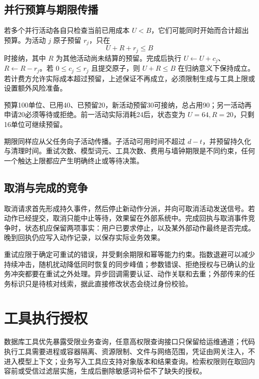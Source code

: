 \documentclass[../textbook.tex]{subfiles}
\begin{document}
\subsection{并行预算与期限传播}
若多个并行活动各自只检查当前已用成本 $U<B$，它们可能同时开始而合计超出预算。为活动 $j$ 原子预留 $r_j$，只在
\begin{equation}
 U+R+r_j\le B
 \label{eq:runtime-reserve}
\end{equation}
时接纳，其中 $R$ 为其他活动尚未结算的预留。完成后执行 $U\leftarrow U+c_j$、$R\leftarrow R-r_j$。若 $0\le c_j\le r_j$ 且提交原子，则 $U+R\le B$ 在归纳意义下保持成立。若计费方允许实际成本超过预留，上述保证不再成立，必须限制生成与工具上限或设置额外风险准备。

\begin{example}[并行调用的预算预留]
预算100单位、已用40、已预留20，新活动预留30可接纳，总占用90；另一活动再申请20必须等待或拒绝。前一活动实际消耗24后，状态变为 $U=64,R=20$，只剩16单位可继续预留。
\end{example}

期限同样应从父任务向子活动传播。子活动可用时间不超过 $d-t$，并预留持久化与清理时间。重试次数、模型词元、工具次数、费用与墙钟期限是不同约束，任何一个触达上限都应产生明确终止或等待决策。

\subsection{取消与完成的竞争}
取消请求首先形成持久事件，然后停止新动作分派，并向可取消活动发送信号。若动作已经提交，取消只能中止等待，效果留在外部系统中。完成回执与取消事件竞争时，状态机应保留两项事实：用户已要求停止，以及某外部动作最终是否完成。晚到回执仍应写入动作记录，以保存实际业务效果。

重试应限于确定可重试的错误，并受剩余期限和幂等能力约束。指数退避可以减少持续冲击，随机扰动降低同时恢复的同步峰值；参数错误、拒绝授权与已确认的业务冲突都要在重试之外处理。异步回调需要认证、动作关联和去重；外部传来的任务标识只是待核对线索，据此直接修改状态会绕过身份校验。

\section{工具执行授权}

数据库工具优先暴露受限业务查询，任意高权限查询接口只保留给运维通道；代码执行工具需要进程或容器隔离、资源限制、文件与网络范围，凭证由网关注入，不进入模型上下文；业务写入工具应支持对象版本和结果查询。检索权限则在取回内容前或受信过滤层实施，生成后删除敏感词补偿不了缺失的授权。
\end{document}
